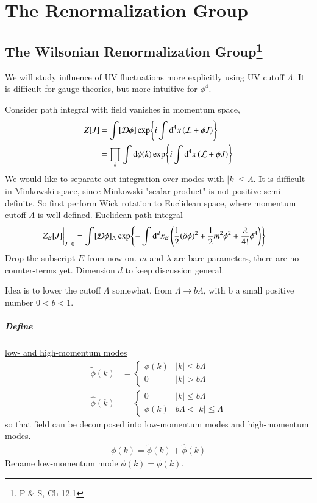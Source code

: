 \chapter{The Renormalization Group}
\section[The Wilsonian Renormalization Group]{The Wilsonian Renormalization Group\footnote{P \& S, Ch 12.1}}
We will study influence of UV fluctuations more explicitly using UV cutoff $\Lambda$. It is difficult for gauge theories, but more intuitive for $\phi^4$.

Consider path integral with field vanishes in momentum space,
\begin{align*}
   Z[J] &= \int [\mathcal{D} \phi] \exp{i\int \dd[4]{x} (\mathcal{L}+ \phi J)} \\
        &= \prod_k \int \dd{\phi(k)}  \exp{i\int \dd[4]{x} (\mathcal{L}+ \phi J)}
\end{align*} 
We would like to separate out integration over modes with $|k| \leq \Lambda$. It is difficult in Minkowski space, since Minkowski "scalar product" is not positive semi-definite. So first perform Wick rotation to Euclidean space, where momentum cutoff $\Lambda$ is well defined. Euclidean path integral
\begin{align}
   \eval{Z_E[J]}_{J=0} &= \int [\D \phi]_\Lambda \exp{-\int \dd[d]{x_E} \left(\frac{1}{2} ( \partial \phi)^2 + \frac{1}{2} m^2 \phi^2 + \frac{\lambda}{4!}\phi^4 \right)}
\end{align}
Drop the subscript $E$ from now on. $m$ and $\lambda$ are bare parameters, there are no counter-terms yet. Dimension $d$ to keep discussion general.

Idea is to lower the cutoff $\Lambda$ somewhat, from $\Lambda \rightarrow b \Lambda$, with b a small positive number $ 0 < b < 1$. 
\paragraph{Define} \underline{low- and high-momentum modes} 
\begin{align}
   \tilde{\phi}(k) &= \begin{cases} \phi(k) & |k| \leq b \Lambda  \\ 0 &  |k| > b\Lambda \end{cases} \\
   \hat{\phi}(k) &= \begin{cases} 0 & |k| \leq b \Lambda \\ \phi(k) & b \Lambda < |k| \leq \Lambda \end{cases}
\end{align}
so that field can be decomposed into low-momentum modes and high-momentum modes.
\begin{align}
   \phi(k) = \tilde{\phi}(k) + \hat{\phi}(k) 
\end{align}
Rename low-momentum mode $\tilde{\phi}(k) = \phi(k)$.

